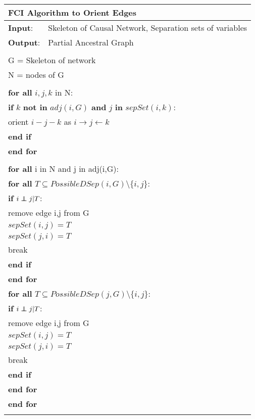 \documentclass{article}
\newcommand\independent{\protect\mathpalette{\protect\independenT}{\perp}}
\def\independenT#1#2{\mathrel{\rlap{$#1#2$}\mkern2mu{#1#2}}}
\begin{document}
	\begin{longtable}{|l l|}
		\hline
		\multicolumn{2}{|l|}{FCI Algorithm to Orient Edges}\\ 
		\hline
		\textbf{Input}: & Skeleton of Causal Network, Separation sets of variables\\
		\textbf{Output}: & Partial Ancestral Graph\\
		&\\
		\multicolumn{2}{|l|}{G = Skeleton of network}\\
		\multicolumn{2}{|l|}{N = nodes of G}\\
		&\\
		\multicolumn{2}{|l|}{\textbf{for all} $ i,j,k $ in N:}\\
		\multicolumn{2}{|l|}{\quad\textbf{if} $ k $ \textbf{not in} $ adj(i,G) $ \textbf{and} $ j $ \textbf{in} $sepSet( i,k)$:}\\
		\multicolumn{2}{|l|}{\quad\quad orient $ i-j-k $ as $ i\rightarrow j \leftarrow k $ }\\
		\multicolumn{2}{|l|}{\quad\textbf{end if}}\\
		\multicolumn{2}{|l|}{\textbf{end for}}\\
		&\\
		
		\multicolumn{2}{|l|}{\textbf{for all} i in N and j in adj(i,G):}\\
		\multicolumn{2}{|l|}{\quad \textbf{for all} $T \subseteq PossibleDSep(i,G)\setminus \{i,j\}$:}\\
		\multicolumn{2}{|l|}{\quad\quad \textbf{if} $i \independent j | T$:}\\
		\multicolumn{2}{|l|}{\quad\quad \quad remove edge i,j from G}\\
		\multicolumn{2}{|l|}{\quad\quad \quad $sepSet(i,j) = T$}\\	
		\multicolumn{2}{|l|}{\quad\quad \quad $sepSet(j,i) = T$}\\
		\multicolumn{2}{|l|}{\quad\quad \quad break}\\
		\multicolumn{2}{|l|}{\quad\quad\textbf{end if}}\\
		\multicolumn{2}{|l|}{\quad\textbf{end for}}\\
		\multicolumn{2}{|l|}{\quad \textbf{for all} $T \subseteq PossibleDSep(j,G)\setminus \{i,j\}$:}\\
		\multicolumn{2}{|l|}{\quad\quad \textbf{if} $i \independent j | T$:}\\
		\multicolumn{2}{|l|}{\quad\quad \quad remove edge i,j from G}\\
		\multicolumn{2}{|l|}{\quad\quad \quad $sepSet(i,j) = T$}\\	
		\multicolumn{2}{|l|}{\quad\quad \quad $sepSet(j,i) = T$}\\
		\multicolumn{2}{|l|}{\quad\quad \quad break}\\
		\multicolumn{2}{|l|}{\quad\quad\textbf{end if}}\\
		\multicolumn{2}{|l|}{\quad\textbf{end for}}\\
		\multicolumn{2}{|l|}{\textbf{end for}}\\	
		&\\
		

\end{longtable}
\end{document}
